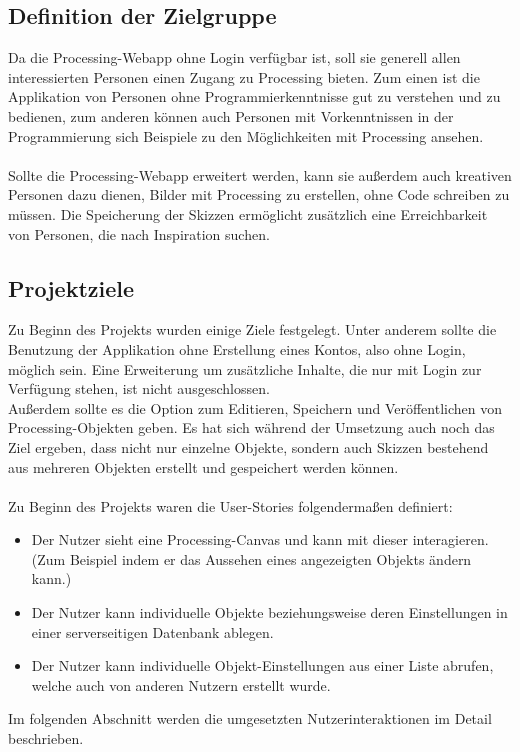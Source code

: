 \documentclass[12pt, ngerman, utf8]{article}
\begin{document}
\subsection{Definition der Zielgruppe}
Da die Processing-Webapp ohne Login verfügbar ist, soll sie generell allen interessierten Personen einen Zugang zu Processing bieten. Zum einen ist die Applikation von Personen ohne Programmierkenntnisse gut zu verstehen und zu bedienen, zum anderen können auch Personen mit Vorkenntnissen in der Programmierung sich Beispiele zu den Möglichkeiten mit Processing ansehen.\\\\
Sollte die Processing-Webapp erweitert werden, kann sie außerdem auch kreativen Personen dazu dienen, Bilder mit Processing zu erstellen, ohne Code schreiben zu müssen. Die Speicherung der Skizzen ermöglicht zusätzlich eine Erreichbarkeit von Personen, die nach Inspiration suchen.

\subsection{Projektziele}
Zu Beginn des Projekts wurden einige Ziele festgelegt. Unter anderem sollte die Benutzung der Applikation ohne Erstellung eines Kontos, also ohne Login, möglich sein. Eine Erweiterung um zusätzliche Inhalte, die nur mit Login zur Verfügung stehen, ist nicht ausgeschlossen.\\
Außerdem sollte es die Option zum Editieren, Speichern und Veröffentlichen von Processing-Objekten geben. Es hat sich während der Umsetzung auch noch das Ziel ergeben, dass nicht nur einzelne Objekte, sondern auch Skizzen bestehend aus mehreren Objekten erstellt und gespeichert werden können.\\\\
Zu Beginn des Projekts waren die User-Stories folgendermaßen definiert:
\begin{itemize}
\item Der Nutzer sieht eine Processing-Canvas und kann mit dieser interagieren. (Zum Beispiel indem er das Aussehen eines angezeigten Objekts ändern kann.)
\item Der Nutzer kann individuelle Objekte beziehungsweise deren Einstellungen in einer serverseitigen Datenbank ablegen.
\item Der Nutzer kann individuelle Objekt-Einstellungen aus einer Liste abrufen, welche auch von anderen Nutzern erstellt wurde.
\end{itemize}
Im folgenden Abschnitt werden die umgesetzten Nutzerinteraktionen im Detail beschrieben.
\end{document}
